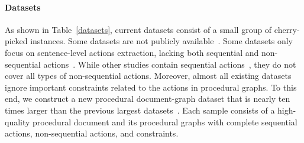 

\paragraph{Datasets}

As shown in Table~\ref{datasets}, current datasets consist of a small group of cherry-picked instances. 
Some datasets are not publicly available~\cite{epure2015automatic, ferreira2017semi}. 
Some datasets only focus on sentence-level actions extraction, lacking both sequential and non-sequential actions~\cite{quishpi2020extracting, qian2020approach, ackermann2021data}. While other studies contain sequential actions~\citet{friedrich2011process, mendling2019natural, lopez2021declarative, bellan2022pet, liang2023knowing, ren2023constructing}, they do not cover all types of non-sequential actions. Moreover, almost all existing datasets ignore important constraints related to the actions in procedural graphs. To this end, we construct a new procedural document-graph dataset that is nearly ten times larger than the previous largest datasets~\cite{ackermann2021data,qian2020approach}. Each sample consists of a high-quality procedural document and its procedural graphs with complete sequential actions, non-sequential actions, and constraints.

